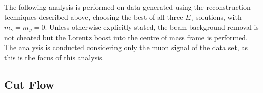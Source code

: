 The following analysis is performed on data generated using the reconstruction techniques described above, choosing the best of all three ${E}_{\gamma}$ solutions, with  ${m}_{\gamma} = {m}_{\nu} = 0$. Unless otherwise explicitly stated, the beam background removal is not cheated but the Lorentz boost into the centre of mass frame is performed. The analysis is conducted considering only the muon signal of the data set, as this is the focus of this analysis.
\subsection{Cut Flow}
\label{SUBSEC:CutFlow}

